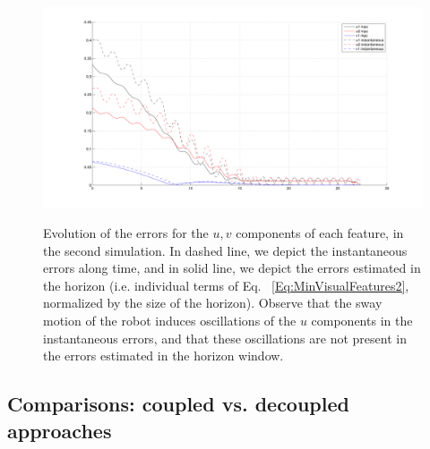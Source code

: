 \begin{figure}[ht]
 \centering
 \includegraphics[scale=.25]{Chap4-Visual-Servoing/errors_mpc_instantaneous}
 \label{Fig:Results6a}
 \caption[]{\label{Fig:Results6}\small{Evolution of the errors for the $u,v$ components of each feature, in the second simulation. In dashed line, we depict the instantaneous errors along time, and in solid line, we depict the errors estimated in the horizon (i.e. individual terms of Eq.~ \ref{Eq:MinVisualFeatures2}, normalized by the size of the horizon). Observe that the sway motion of the robot induces oscillations of the $u$ components in the instantaneous errors, and that these oscillations are not present in the errors estimated in the horizon window.}}
 \end{figure}

\subsection{Comparisons: coupled vs. decoupled approaches}

